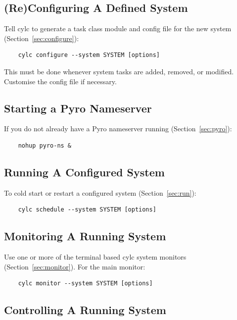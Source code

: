 \documentclass[11pt,a4paper]{article}
\begin{document}
\subsection{(Re)Configuring A Defined System}

Tell cylc to generate a task class module and config file for the new
system (Section~\ref{sec:configure}): 

\begin{lstlisting}
    cylc configure --system SYSTEM [options]
\end{lstlisting}

This must be done whenever system tasks are added, removed, or modified.
Customise the config file if necessary.

\subsection{Starting a Pyro Nameserver}

If you do not already have a Pyro nameserver running
(Section~\ref{sec:pyro}): 

\begin{lstlisting}
    nohup pyro-ns &
\end{lstlisting}

\subsection{Running A Configured System}

To cold start or restart a configured system (Section~\ref{sec:run}):

\begin{lstlisting}
    cylc schedule --system SYSTEM [options]
\end{lstlisting}
    
\subsection{Monitoring A Running System}

Use one or more of the terminal based cylc system monitors
(Section~\ref{sec:monitor}). For the main monitor: 

\begin{lstlisting}
    cylc monitor --system SYSTEM [options]
\end{lstlisting}

\subsection{Controlling A Running System}
\end{document}
